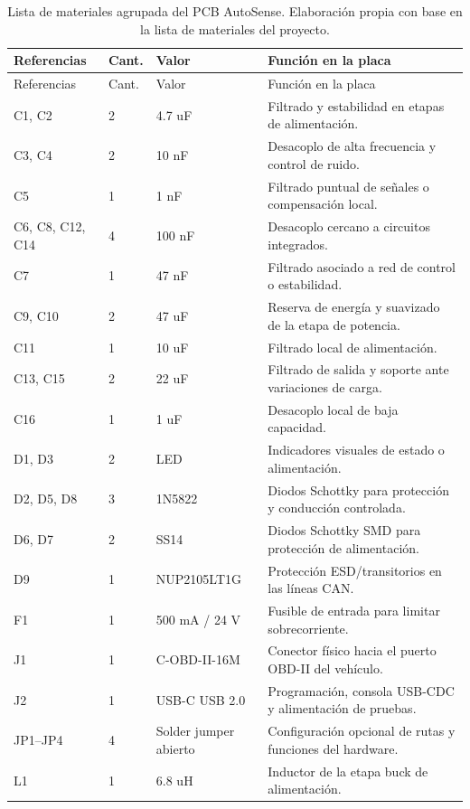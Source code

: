 \documentclass[12pt,letterpaper]{report}
\begin{document}
\begin{longtable}{@{}p{}p{}p{}p{}@{}}
\caption{Lista de materiales agrupada del PCB AutoSense. Elaboración propia con base en la lista de materiales del proyecto.}
\label{tab:hardware-bom-agrupado}\\
\toprule
Referencias & Cant. & Valor & Función en la placa \\
\midrule
\endfirsthead
\toprule
Referencias & Cant. & Valor & Función en la placa \\
\midrule
\endhead
C1, C2 & 2 & 4.7 uF & Filtrado y estabilidad en etapas de alimentación. \\
C3, C4 & 2 & 10 nF & Desacoplo de alta frecuencia y control de ruido. \\
C5 & 1 & 1 nF & Filtrado puntual de señales o compensación local. \\
C6, C8, C12, C14 & 4 & 100 nF & Desacoplo cercano a circuitos integrados. \\
C7 & 1 & 47 nF & Filtrado asociado a red de control o estabilidad. \\
C9, C10 & 2 & 47 uF & Reserva de energía y suavizado de la etapa de potencia. \\
C11 & 1 & 10 uF & Filtrado local de alimentación. \\
C13, C15 & 2 & 22 uF & Filtrado de salida y soporte ante variaciones de carga. \\
C16 & 1 & 1 uF & Desacoplo local de baja capacidad. \\
D1, D3 & 2 & LED & Indicadores visuales de estado o alimentación. \\
D2, D5, D8 & 3 & 1N5822 & Diodos Schottky para protección y conducción controlada. \\
D6, D7 & 2 & SS14 & Diodos Schottky SMD para protección de alimentación. \\
D9 & 1 & NUP2105LT1G & Protección ESD/transitorios en las líneas CAN. \\
F1 & 1 & 500 mA / 24 V & Fusible de entrada para limitar sobrecorriente. \\
J1 & 1 & C-OBD-II-16M & Conector físico hacia el puerto OBD-II del vehículo. \\
J2 & 1 & USB-C USB 2.0 & Programación, consola USB-CDC y alimentación de pruebas. \\
JP1--JP4 & 4 & Solder jumper abierto & Configuración opcional de rutas y funciones del hardware. \\
L1 & 1 & 6.8 uH & Inductor de la etapa buck de alimentación. \\

\end{longtable}
\end{document}
